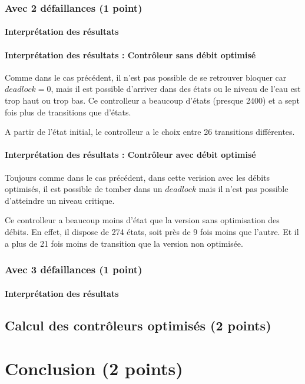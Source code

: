 \documentclass[a4paper]{book}
\begin{document}
\subsubsection{Avec 2 défaillances (1 point)}


%
%
%
\paragraph{Interprétation des résultats}
\paragraph{Interprétation des résultats : Contrôleur sans débit optimisé}
Comme dans le cas précédent, il n'est pas possible de se retrouver bloquer car $deadlock=0$, mais il est possible d'arriver dans des états ou le niveau de l'eau est trop haut ou trop bas.
Ce controlleur a beaucoup d'états (presque 2400) et a sept fois plus de transitions que d'états.

A partir de l'état initial, le controlleur a le choix entre 26 transitions différentes.
\paragraph{Interprétation des résultats : Contrôleur avec débit optimisé}
Toujours comme dans le cas précédent, dans cette verision avec les débits optimisés, il est possible de tomber dans un $deadlock$ mais il n'est pas possible d'atteindre un niveau critique.

Ce controlleur a beaucoup moins d'état que la version sans optimisation des débits. En effet, il dispose de 274 états, soit près de 9 fois moins que l'autre.
Et il a plus de 21 fois moins de transition que la version non optimisée.


\subsubsection{Avec 3 défaillances (1 point)}


%
%
%
\paragraph{Interprétation des résultats}

\subsection{Calcul des contrôleurs optimisés (2 points)}

\section{Conclusion (2 points)}
\end{document}
